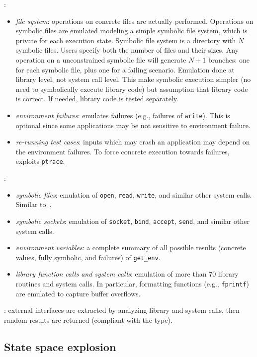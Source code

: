 \documentclass[10pt, a4paper]{article}
\begin{document}
\cite{KLEE-OSDI08}:
\begin{itemize}
  \item {\em file system}: operations on concrete files are actually performed. Operations on symbolic files are emulated modeling a simple symbolic file system, which is private for each execution state. Symbolic file system is a directory with $N$ symbolic files. Users specify both the number of files and their sizes. Any operation on a unconstrained symbolic file will generate $N+1$ branches: one for each symbolic file, plus one for a failing scenario. Emulation done at library level, not system call level. This make symbolic execution simpler (no need to symbolically execute library code) but assumption that library code is correct. If needed, library code is tested separately.
  \item {\em environment failures}: \cite{KLEE-OSDI08} emulates failures (e.g., failures of {\tt write}). This is optional since some applications may be not sensitive to environment failure.
  \item {\em re-running test cases}: inputs which may crash an application may depend on the environment failures. To force concrete execution towards failures, \cite{KLEE-OSDI08} exploits {\tt ptrace}.
\end{itemize}

\cite{AEG-NDSS11}:
\begin{itemize}
  \item {\em symbolic files}: emulation of {\tt open}, {\tt read}, {\tt write}, and similar other system calls. Similar to~\cite{KLEE-OSDI08}.
  \item {\em symbolic sockets}: emulation of {\tt socket}, {\tt bind}, {\tt accept}, {\tt send}, and similar other system calls. 
  \item {\em environment variables}: a complete summary of all possible results (concrete values, fully symbolic, and failures) of {\tt get\_env}.
  \item {\em library function calls and system calls}: emulation of more than 70 library routines and system calls. In particular, formatting functions (e.g., {\tt fprintf}) are emulated to capture buffer overflows.
\end{itemize}

\cite{DART-PLDI05}: external interfaces are extracted by analyzing library and system calls, then random results are returned (compliant with the type).

\subsection{State space explosion}
\end{document}
